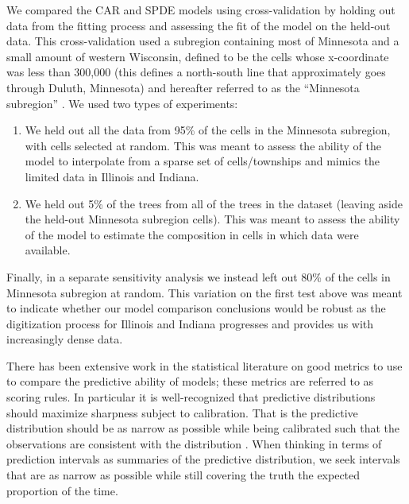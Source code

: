 \documentclass[12pt]{article}\usepackage[]{graphicx}\usepackage[]{color}
\begin{document}
We compared the CAR and SPDE models using cross-validation by holding
out data from the fitting process and assessing the fit of the model
on the held-out data. This cross-validation used a subregion containing
most of Minnesota and a small amount of western Wisconsin, defined
to be the cells whose x-coordinate was less than 300,000 (this defines
a north-south line that approximately goes through Duluth, Minnesota)
and hereafter referred to as the ``Minnesota subregion'' . We used
two types of experiments:
\begin{enumerate}
\item We held out all the data from 95\% of the cells in the Minnesota subregion,
with cells selected at random. This was meant to assess the ability
of the model to interpolate from a sparse set of cells/townships and
mimics the limited data in Illinois and Indiana.
\item We held out 5\% of the trees from all of the trees in the dataset
(leaving aside the held-out Minnesota subregion cells). This was meant
to assess the ability of the model to estimate the composition in
cells in which data were available. 
\end{enumerate}
Finally, in a separate sensitivity analysis we instead left out 80\%
of the cells in Minnesota subregion at random. This variation on the
first test above was meant to indicate whether our model comparison
conclusions would be robust as the digitization process for Illinois
and Indiana progresses and provides us with increasingly dense data. 

There has been extensive work in the statistical literature on good
metrics to use to compare the predictive ability of models; these
metrics are referred to as scoring rules. In particular it is well-recognized
that predictive distributions should maximize sharpness subject to
calibration. That is the predictive distribution should be as narrow
as possible while being calibrated such that the observations are
consistent with the distribution \citep{Gnei:etal:2007}. When thinking
in terms of prediction intervals as summaries of the predictive distribution,
we seek intervals that are as narrow as possible while still covering
the truth the expected proportion of the time. 
\end{document}

